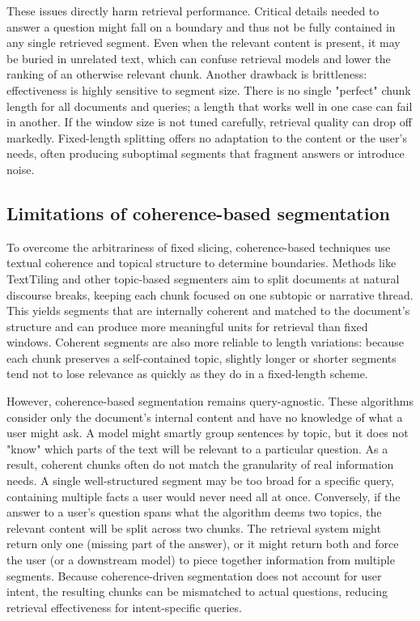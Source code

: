 \documentclass[12pt,a4paper]{report}
\begin{document}
These issues directly harm retrieval performance. Critical details needed to answer a question might fall on a boundary and thus not be fully contained in any single retrieved segment. Even when the relevant content is present, it may be buried in unrelated text, which can confuse retrieval models and lower the ranking of an otherwise relevant chunk. Another drawback is brittleness: effectiveness is highly sensitive to segment size. There is no single "perfect" chunk length for all documents and queries; a length that works well in one case can fail in another. If the window size is not tuned carefully, retrieval quality can drop off markedly. Fixed-length splitting offers no adaptation to the content or the user's needs, often producing suboptimal segments that fragment answers or introduce noise.

\subsection{Limitations of coherence-based segmentation}
To overcome the arbitrariness of fixed slicing, coherence-based techniques use textual coherence and topical structure to determine boundaries. Methods like TextTiling and other topic-based segmenters aim to split documents at natural discourse breaks, keeping each chunk focused on one subtopic or narrative thread. This yields segments that are internally coherent and matched to the document's structure and can produce more meaningful units for retrieval than fixed windows. Coherent segments are also more reliable to length variations: because each chunk preserves a self-contained topic, slightly longer or shorter segments tend not to lose relevance as quickly as they do in a fixed-length scheme.

However, coherence-based segmentation remains query-agnostic. These algorithms consider only the document's internal content and have no knowledge of what a user might ask. A model might smartly group sentences by topic, but it does not "know" which parts of the text will be relevant to a particular question. As a result, coherent chunks often do not match the granularity of real information needs. A single well-structured segment may be too broad for a specific query, containing multiple facts a user would never need all at once. Conversely, if the answer to a user's question spans what the algorithm deems two topics, the relevant content will be split across two chunks. The retrieval system might return only one (missing part of the answer), or it might return both and force the user (or a downstream model) to piece together information from multiple segments. Because coherence-driven segmentation does not account for user intent, the resulting chunks can be mismatched to actual questions, reducing retrieval effectiveness for intent-specific queries.
\end{document}
